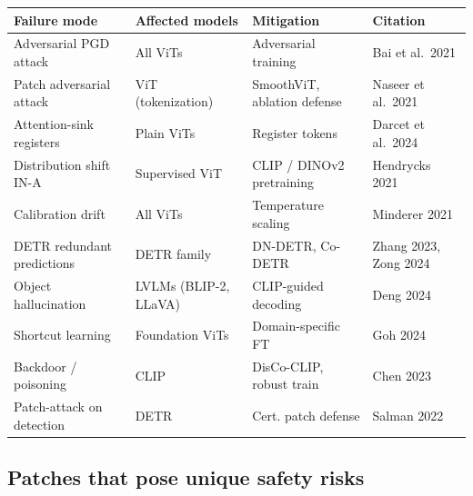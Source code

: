 {\def\LTcaptype{none} %
\begin{longtable}[]{@{}
  >{\raggedright\arraybackslash}p{}
  >{\raggedright\arraybackslash}p{}
  >{\raggedright\arraybackslash}p{}
  >{\raggedright\arraybackslash}p{}@{}}
\toprule\noalign{}
\begin{minipage}[b]{\linewidth}\raggedright
Failure mode
\end{minipage} & \begin{minipage}[b]{\linewidth}\raggedright
Affected models
\end{minipage} & \begin{minipage}[b]{\linewidth}\raggedright
Mitigation
\end{minipage} & \begin{minipage}[b]{\linewidth}\raggedright
Citation
\end{minipage} \\
\midrule\noalign{}
\endhead
\bottomrule\noalign{}
\endlastfoot
Adversarial PGD attack & All ViTs & Adversarial training & Bai et al.~2021 \\
Patch adversarial attack & ViT (tokenization) & SmoothViT, ablation defense & Naseer et al.~2021 \\
Attention-sink registers & Plain ViTs & Register tokens & Darcet et al.~2024 \\
Distribution shift IN-A & Supervised ViT & CLIP / DINOv2 pretraining & Hendrycks 2021 \\
Calibration drift & All ViTs & Temperature scaling & Minderer 2021 \\
DETR redundant predictions & DETR family & DN-DETR, Co-DETR & Zhang 2023, Zong 2024 \\
Object hallucination & LVLMs (BLIP-2, LLaVA) & CLIP-guided decoding & Deng 2024 \\
Shortcut learning & Foundation ViTs & Domain-specific FT & Goh 2024 \\
Backdoor / poisoning & CLIP & DisCo-CLIP, robust train & Chen 2023 \\
Patch-attack on detection & DETR & Cert. patch defense & Salman 2022 \\
\end{longtable}
}

\subsection{Patches that pose unique safety risks}\label{patches-that-pose-unique-safety-risks}

